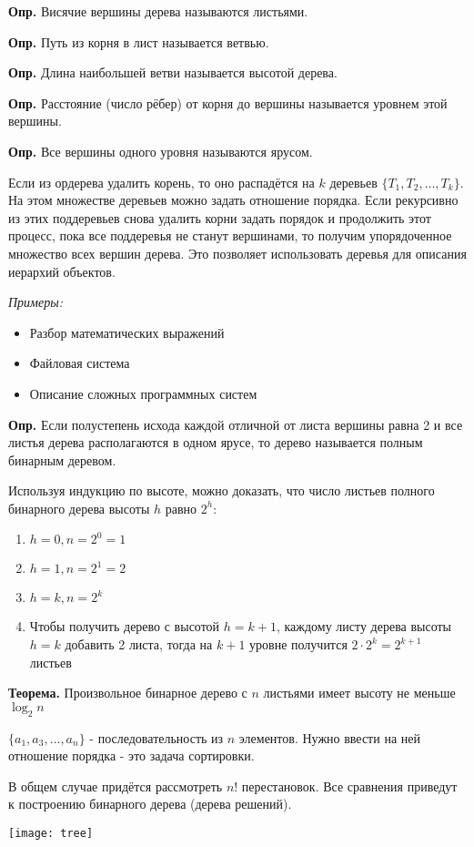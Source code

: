 \documentclass[10pt]{article}
\begin{document}
\par\textbf{Опр.} Висячие вершины дерева называются листьями.
\par\textbf{Опр.} Путь из корня в лист называется ветвью.
\par\textbf{Опр.} Длина наибольшей ветви называется высотой дерева.
\par\textbf{Опр.} Расстояние (число рёбер) от корня до вершины называется уровнем этой вершины.
\par\textbf{Опр.} Все вершины одного уровня называются ярусом.
\par Если из ордерева удалить корень, то оно распадётся на $k$ деревьев $\{ T_{1}, T_{2}, \dots, T_{k} \}$. На этом множестве деревьев можно задать отношение порядка. Если рекурсивно из этих поддеревьев снова удалить корни задать порядок и продолжить этот процесс, пока все поддеревья не станут вершинами, то получим упорядоченное множество всех вершин дерева. Это позволяет использовать деревья для описания иерархий объектов.
\par\textit{Примеры:}
\begin{itemize}
\item Разбор математических выражений
\item Файловая система
\item Описание сложных программных систем
\end{itemize}

\par\textbf{Опр.} Если полустепень исхода каждой отличной от листа вершины равна 2 и все листья дерева располагаются в одном ярусе, то дерево называется полным бинарным деревом.
\par Используя индукцию по высоте, можно доказать, что число листьев полного бинарного дерева высоты $h$ равно $2^h$:
\begin{enumerate}
    \item $h = 0, n = 2^0 = 1$
    \item $h = 1, n = 2^1 = 2$
    \item $h = k, n = 2^k$
    \item Чтобы получить дерево с высотой $h = k + 1$, каждому листу дерева высоты $h = k$ добавить 2 листа, тогда на $k + 1$ уровне получится $2 \cdot 2^k = 2^{k + 1}$ листьев
\end{enumerate}

\par\textbf{Теорема.} Произвольное бинарное дерево с $n$ листьями имеет высоту не меньше $\log_{2}n$

\par $\{ a_{1}, a_{3}, \dots, a_{n} \}$ - последовательность из $n$ элементов. Нужно ввести на ней отношение порядка - это задача сортировки.
\par В общем случае придётся рассмотреть $n!$ перестановок. Все сравнения приведут к построению бинарного дерева (дерева решений).
\begin{center}
    \texttt{[image: tree]}
\end{center}
\end{document}
